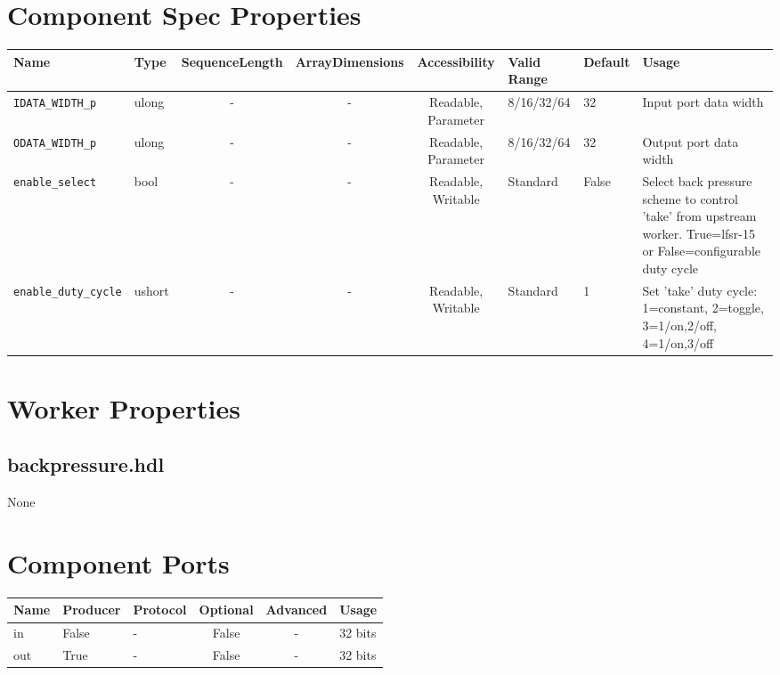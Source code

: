 \documentclass{article}
\def\comp{backpressure}
\begin{document}
\begin{landscape}
	\section*{Component Spec Properties}
	\begin{scriptsize}
		\begin{tabular}{|p{2cm}|p{1.5cm}|c|c|c|p{1.5cm}|p{1cm}|p{7cm}|}
			\hline
			\rowcolor{blue}
			Name                 & Type   & SequenceLength & ArrayDimensions & Accessibility       & Valid Range & Default & Usage                                                 \\
			\hline
			\verb+IDATA_WIDTH_p+ & ulong  & -              & -               & Readable, Parameter & 8/16/32/64  & 32      & Input port data width                                 \\
			\hline
			\verb+ODATA_WIDTH_p+ & ulong  & -              & -               & Readable, Parameter & 8/16/32/64  & 32      & Output port data width                                \\
			\hline
			\verb+enable_select+     & bool & -              & -               & Readable, Writable  & Standard    & False       & Select back pressure scheme to control 'take' from upstream worker. True=lfsr-15 or False=configurable duty cycle \\
			\hline
			\verb+enable_duty_cycle+   & ushort & -              & -               & Readable, Writable  & Standard    & 1    & Set 'take' duty cycle: 1=constant, 2=toggle, 3=1/on,2/off, 4=1/on,3/off \\
			\hline
		\end{tabular}
	\end{scriptsize}

	\section*{Worker Properties}
	\subsection*{\comp.hdl}
	None

	\section*{Component Ports}
	\begin{scriptsize}
		\begin{tabular}{|M{2cm}|M{1.5cm}|M{4cm}|c|c|M{9cm}|}
			\hline
			\rowcolor{blue}
			Name & Producer & Protocol & Optional & Advanced & Usage                                  \\
			\hline
			in   & False    & -        & False    & -        & 32 bits                            \\
			\hline
			out  & True     & -        & False    & -        & 32 bits \\
			\hline
		\end{tabular}
	\end{scriptsize}


\end{landscape}
\end{document}
